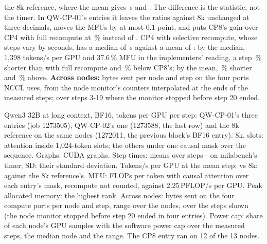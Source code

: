 the 8k reference, where the mean gives \TriQwCpStepRef\,s and \TriQwCpTokRef. The difference is the statistic, not the timer. In QW-CP-01's entries it leaves the ratios against 8k unchanged at three decimals, moves the MFUs by at most 0.1 point, and puts CP8's gain over CP4 with full recompute at \TriQwCpEightShorterMed\,\% instead of \TriQwCpEightShorter. CP4 with selective recompute, whose steps vary by seconds, has a median of \TriQwCpMedCpFourSel\,s against a mean of \TriQwCpStepCpFourSel: by the median, 1,398 tokens/s per GPU and 37.6\,\% MFU in the implementers' reading, a step \TriQwCpSelShorterMed\,\% shorter than with full recompute and \TriQwCpSelEightMed\,\% below CP8's; by the mean, \TriQwCpSelShorter\,\% shorter and \TriQwCpSelEight\,\% above. \textbf{Across nodes:} bytes sent per node and step on the four ports NCCL uses, from the node monitor's counters interpolated at the ends of the measured steps; over steps 3-19 where the monitor stopped before step 20 ended.

\begin{table}[h]
  \caption{Qwen3 32B at long context, BF16, \TriQwCpTokGpu{} tokens per GPU per step: QW-CP-01's three entries (job 1273505), QW-CP-02's one (1273588, the last row) and the 8k reference on the same nodes (1272011, the previous block's BF16 entry). 8k, slots: attention inside 1,024-token slots; the others under one causal mask over the sequence. Graphs: CUDA graphs. Step times: means over steps \TriQwCpFrom-\TriQwCpSteps{} on milabench's timer; SD: their standard deviation. Tokens/s per GPU at the mean step; vs 8k: against the 8k reference's. MFU: FLOPs per token with causal attention over each entry's mask, recompute not counted, against 2.25\,PFLOP/s per GPU. Peak allocated memory: the highest rank. Across nodes: bytes sent on the four compute ports per node and step, range over the nodes, over the steps shown (the node monitor stopped before step 20 ended in four entries). Power cap: share of each node's GPU samples with the software power cap over the measured steps, the median node and the range. The CP8 entry ran on 12 of the 13 nodes.}
  \label{tab:qw_cp_speed}
  \centering\small
  \begin{adjustbox}{max width=\linewidth}
  \end{adjustbox}
\end{table}

